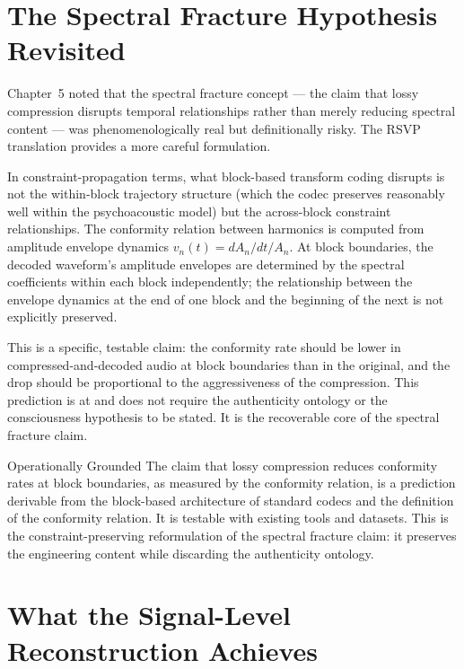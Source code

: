 \section{The Spectral Fracture Hypothesis Revisited}
\label{sec:spectral-fracture-rsvp}

Chapter~5 noted that the spectral fracture concept ---
the claim that lossy compression disrupts temporal
relationships rather than merely reducing spectral
content --- was phenomenologically real but definitionally
risky. The RSVP translation provides a more careful
formulation.

In constraint-propagation terms, what block-based
transform coding disrupts is not the within-block
trajectory structure (which the codec preserves
reasonably well within the psychoacoustic model) but
the across-block constraint relationships. The
conformity relation between harmonics is computed
from amplitude envelope dynamics $v_n(t) = dA_n/dt / A_n$.
At block boundaries, the decoded waveform's amplitude
envelopes are determined by the spectral coefficients
within each block independently; the relationship
between the envelope dynamics at the end of one block
and the beginning of the next is not explicitly preserved.

This is a specific, testable claim: the \HCFone{}
conformity rate should be lower in compressed-and-decoded
audio at block boundaries than in the original, and
the drop should be proportional to the aggressiveness
of the compression. This prediction is at \LevelI{}
and does not require the authenticity ontology or the
consciousness hypothesis to be stated. It is the
recoverable core of the spectral fracture claim.

\begin{epistemicstatus}{Operationally Grounded}
The claim that lossy compression reduces conformity
rates at block boundaries, as measured by the \HCFone{}
conformity relation, is a \LevelI{} prediction derivable
from the block-based architecture of standard codecs
and the definition of the conformity relation. It is
testable with existing tools and datasets. This is
the constraint-preserving reformulation of the spectral
fracture claim: it preserves the engineering content
while discarding the authenticity ontology.
\end{epistemicstatus}

\section{What the Signal-Level Reconstruction Achieves}
\label{sec:signal-reconstruction-achievement}

